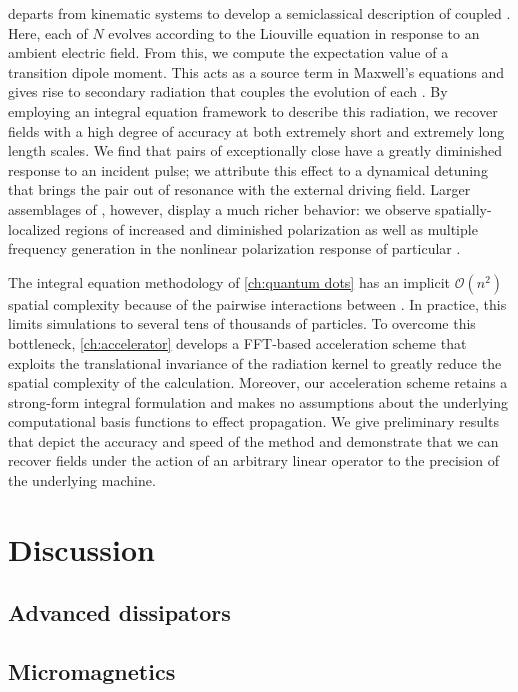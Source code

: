  departs from kinematic systems to develop a semiclassical description of coupled \qds{}.
Here, each of $N$ \qds{} evolves according to the Liouville equation in response to an ambient electric field.
From this, we compute the expectation value of a transition dipole moment.
This acts as a source term in Maxwell's equations and gives rise to secondary radiation that couples the evolution of each \qd{}.
By employing an integral equation framework to describe this radiation, we recover fields with a high degree of accuracy at both extremely short and extremely long length scales.
We find that pairs of exceptionally close \qds{} have a greatly diminished response to an incident pulse; we attribute this effect to a dynamical detuning that brings the pair out of resonance with the external driving field. 
Larger assemblages of \qds{}, however, display a much richer behavior: we observe spatially-localized regions of increased and diminished polarization as well as multiple frequency generation in the nonlinear polarization response of particular \qds{}.

The integral equation methodology of \cref{ch:quantum dots} has an implicit $\mathcal{O}(n^2)$ spatial complexity because of the pairwise interactions between \qds{}.
In practice, this limits simulations to several tens of thousands of particles.
To overcome this bottleneck, \cref{ch:accelerator} develops a FFT-based acceleration scheme that exploits the translational invariance of the radiation kernel to greatly reduce the spatial complexity of the calculation.
Moreover, our acceleration scheme retains a strong-form integral formulation and makes no assumptions about the underlying computational basis functions to effect propagation.
We give preliminary results that depict the accuracy and speed of the method and demonstrate that we can recover fields under the action of an arbitrary linear operator to the precision of the underlying machine.

\section{Discussion}

\subsection{Advanced dissipators}

\subsection{Micromagnetics}

